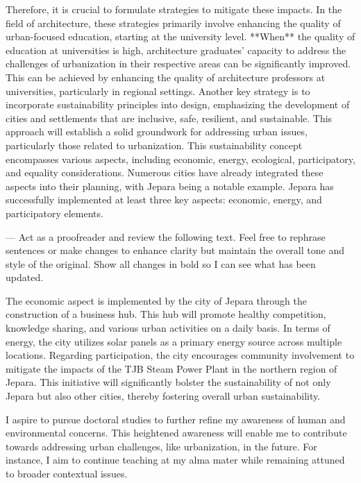 \documentclass[../main.tex]{subfiles}
\begin{document}
Therefore, it is crucial to formulate strategies to mitigate these impacts. In the field of architecture, these strategies primarily involve enhancing the quality of urban-focused education, starting at the university level. **When** the quality of education at universities is high, architecture graduates' capacity to address the challenges of urbanization in their respective areas can be significantly improved. This can be achieved by enhancing the quality of architecture professors at universities, particularly in regional settings. Another key strategy is to incorporate sustainability principles into design, emphasizing the development of cities and settlements that are inclusive, safe, resilient, and sustainable. This approach will establish a solid groundwork for addressing urban issues, particularly those related to urbanization. This sustainability concept encompasses various aspects, including economic, energy, ecological, participatory, and equality considerations. Numerous cities have already integrated these aspects into their planning, with Jepara being a notable example. Jepara has successfully implemented at least three key aspects: economic, energy, and participatory elements.

---
Act as a proofreader and review the following text. Feel free to rephrase sentences or make changes to enhance clarity but maintain the overall tone and style of the original. Show all changes in bold so I can see what has been updated.

The economic aspect is implemented by the city of Jepara through the construction of a business hub. This hub will promote healthy competition, knowledge sharing, and various urban activities on a daily basis. In terms of energy, the city utilizes solar panels as a primary energy source across multiple locations. Regarding participation, the city encourages community involvement to mitigate the impacts of the TJB Steam Power Plant in the northern region of Jepara. This initiative will significantly bolster the sustainability of not only Jepara but also other cities, thereby fostering overall urban sustainability.

I aspire to pursue doctoral studies to further refine my awareness of human and environmental concerns. This heightened awareness will enable me to contribute towards addressing urban challenges, like urbanization, in the future. For instance, I aim to continue teaching at my alma mater while remaining attuned to broader contextual issues.
\end{document}
